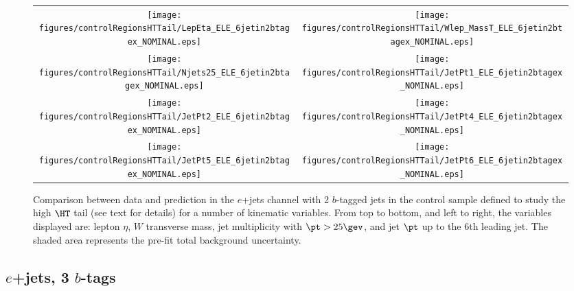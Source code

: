 \begin{figure}[htbp]
\begin{center}
\begin{tabular}{cc}
%
\texttt{[image: figures/controlRegionsHTTail/LepEta\_ELE\_6jetin2btagex\_NOMINAL.eps]} &
\texttt{[image: figures/controlRegionsHTTail/Wlep\_MassT\_ELE\_6jetin2btagex\_NOMINAL.eps]} \\
\texttt{[image: figures/controlRegionsHTTail/Njets25\_ELE\_6jetin2btagex\_NOMINAL.eps]} &
\texttt{[image: figures/controlRegionsHTTail/JetPt1\_ELE\_6jetin2btagex\_NOMINAL.eps]} \\
\texttt{[image: figures/controlRegionsHTTail/JetPt2\_ELE\_6jetin2btagex\_NOMINAL.eps]} &
\texttt{[image: figures/controlRegionsHTTail/JetPt4\_ELE\_6jetin2btagex\_NOMINAL.eps]} \\
\texttt{[image: figures/controlRegionsHTTail/JetPt5\_ELE\_6jetin2btagex\_NOMINAL.eps]} &
\texttt{[image: figures/controlRegionsHTTail/JetPt6\_ELE\_6jetin2btagex\_NOMINAL.eps]} \\
\end{tabular}\caption{\small {Comparison between data and prediction in the $e$+jets channel with 2 $b$-tagged jets in the control sample
defined to study the high $\HT$ tail (see text for details)  for a number of kinematic
variables. From top to bottom, and left to right, the variables displayed are: lepton $\eta$, $W$ transverse mass, jet multiplicity with $\pt>25\gev$, 
and jet $\pt$ up to the 6th leading jet.
The shaded area represents the pre-fit total background uncertainty.}}
\label{fig:ELE_controlHTTail_2btagex_2}
\end{center}
\end{figure}

\clearpage
\subsection{$e$+jets, 3 $b$-tags}
\label{sec:ELE_controlHTTail_3tagex}

